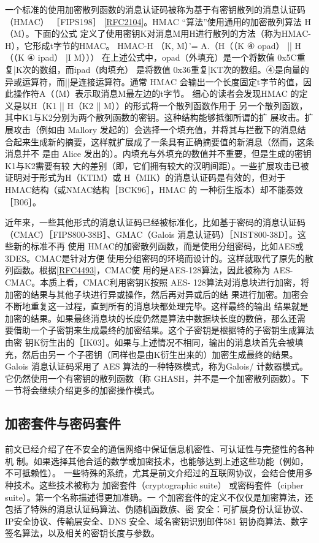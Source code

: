 一个标准的使用加密散列函数的消息认证码被称为基于有密钥散列的消息认证码
（HMAC） ［FIPS198］ \href{https://www.rfc-editor.org/rfc/rfc2104}{[RFC2104]}。HMAC “算法”使用通用的加密散列算法 H（M）。下面的公式
定义了使用密钥K对消息M用H进行散列的方法（称为HMAC-H），它形成t字节的HMAC。
HMAC-H （K, M）’= A.（H（（K ④ opad） || H（（K ④ ipad） |I M）））
在上述公式中，opad（外填充）是一个将数值 0x5C重复|K次的数组，而ipad（肉填充）
是将数值 0x36重复|KT次的数组。④是向量的异或运算符，而||是连接运算符。通常 HMAC
会输出一个长度固定t字节的值，因此操作符A（（M）表示取消息M最左边的t字节。
细心的读者会发现HMAC 的定义是以H（K1 || H（K2 || M））的形式将一个散列函数作用于
另一个散列函数，其中K1与K2分别为两个散列函数的密钥。这种结构能够抵御所谓的扩
展攻击。扩展攻击（例如由 Mallory 发起的）会选择一个填充值，并将其与拦截下的消息结
合起来生成新的摘要，这样就扩展成了一条具有正确摘要值的新消息（然而，这条消息并不
是由 Alice 发出的）。内填充与外填充的数值并不重要，但是生成的密钥K1与K2需要有较
大的差别（即，它们拥有较大的汉明间距）。一些扩展攻击已被证明对于形式为H（KTIM）或
H（MIK）的消息认证码是有效的，但对于 HMAC结构（或NMAC结构［BCK96］，HMAC 的
一种衍生版本）却不能奏效［B06］。

近年来，一些其他形式的消息认证码已经被标准化，比如基于密码的消息认证码
（CMAC）［FIPS800-38B］、GMAC（Galois 消息认证码）［NIST800-38D］。这些新的标准不再
使用 HMAC的加密散列函数，而是使用分组密码，比如AES或3DES。CMAC是针对方便
使用分组密码的环境而设计的。这样就取代了原先的散列函数。根据\href{https://www.rfc-editor.org/rfc/rfc4493}{[RFC4493]}，CMAC使
用的是AES-128算法，因此被称为 AES-CMAC。本质上看，CMAC利用密钥K按照 AES-
128算法对消息块进行加密，将加密的结果与其他子块进行异或操作，然后再对异或后的结
果进行加密。加密会不断地重复这一过程，直到所有的消息块都处理完毕。这样最终的输出
结果就是加密的结果。如果最终消息块的长度仍然是算法中数据块长度的数倍，那么还需
要借助一个子密钥来生成最终的加密结果。这个子密钥是根据特的子密钥生成算法由密
钥K衍生出的［IK03］。如果与上述情况不相同，输出的消息块首先会被填充，然后由另一
个子密钥（同样也是由K衍生出来的）加密生成最终的结果。Galois 消息认证码采用了 AES
算法的一种特殊模式，称为Galois/ 计数器模式。它仍然使用一个有密钥的散列函数（称
GHASH，并不是一个加密散列函数）。下一节将会继续介绍更多的加密操作模式。

\subsection{加密套件与密码套件}
前文已经介绍了在不安全的通信网络中保证信息机密性、可认证性与完整性的各种机
制。如果选择其他合适的数学或加密技术，也能够达到上述这些功能（例如，不可抵赖性）。
一些特殊的系统，尤其是前文介绍过的互联网协议，会结合使用多种技术。这些技术被称为
加密套件（cryptographic suite） 或密码套件（cipher suite）。第一个名称描述得更加准确。一
个加密套件的定义不仅仅是加密算法，还包括了特殊的消息认证码算法、伪随机函数族、密
安全：可扩展身份认证协议、IP安全协议、传輸层安全、DNS 安全、域名密钥识别邮件581
钥协商算法、数字签名算法，以及相关的密钥长度与参数。

